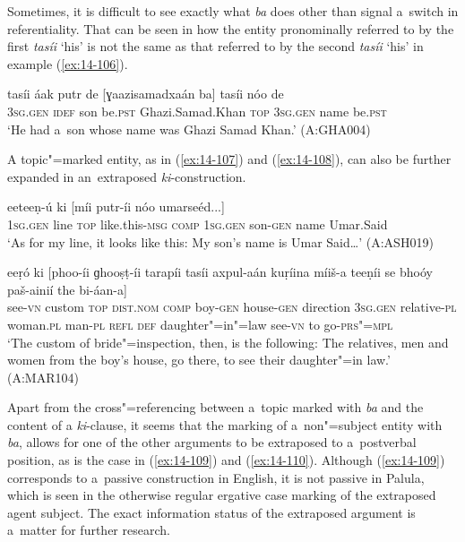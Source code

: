 Sometimes, it is difficult to see exactly what \textit{ba} does other than signal a~switch in referentiality. That can be seen in how the entity pronominally referred to by the first \textit{tasíi} `his' is not the same as that referred to by the second \textit{tasíi} `his' in example (\ref{ex:14-106}).

\begin{exe}
\ex
\label{ex:14-106}
\gll tasíi áak putr de [ɣaazisamadxaán ba]  tasíi nóo de \\
\textsc{3sg.gen} \textsc{idef} son be.\textsc{pst} Ghazi.Samad.Khan \textsc{top}  \textsc{3sg.gen} name be.\textsc{pst} \\
\glt `He had a~son whose name was Ghazi Samad Khan.' (A:GHA004)
\end{exe}

A topic"=marked entity, as in (\ref{ex:14-107}) and (\ref{ex:14-108}), can also be further expanded in an~extraposed \textit{ki}-construction.

\begin{exe}
\ex
\label{ex:14-107}
 eeteeṇ-ú ki [míi putr-íi  nóo umarseéd...]\\
\textsc{1sg.gen} line \textsc{top} like.this-\textsc{msg } \textsc{comp} \textsc{1sg.gen} son-\textsc{gen}  name Umar.Said\\
\glt `As for my line, it looks like this: My son's name is Umar Said{\ldots}' (A:ASH019)

\ex
\label{ex:14-108}
 eeṛó ki [phoo-íi  ɡhooṣṭ-íi tarapíi tasíi
  axpul-aán kuṛíina  míiš-a teeṇíi se bhoóy paš-ainií the bi-áan-a] \\
see-\textsc{vn} custom \textsc{top} \textsc{dist.nom} \textsc{comp} boy-\textsc{gen}  house-\textsc{gen} direction \textsc{3sg.gen} relative-\textsc{pl} woman.\textsc{pl}  man-\textsc{pl} \textsc{refl } \textsc{def} daughter"=in"=law see-\textsc{vn} to go-\textsc{prs"=mpl} \\
\glt `The custom of bride"=inspection, then, is the following: The relatives, men and women from the boy's house, go there, to see their daughter"=in law.' (A:MAR104)
\end{exe}

Apart from the cross"=referencing between a~topic marked with \textit{ba} and the content of a \textit{ki}-clause, it seems that the marking of a~non"=subject entity with \textit{ba}, allows for one of the other arguments to be extraposed to a~postverbal position, as is the case in (\ref{ex:14-109}) and (\ref{ex:14-110}). Although (\ref{ex:14-109}) corresponds to a~passive construction in English, it is not passive in Palula, which is seen in the otherwise regular ergative case marking of the extraposed agent subject. The exact information status of the extraposed argument is a~matter for further research.

